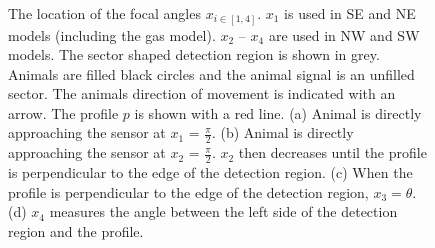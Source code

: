\begin{figure}[t]
  \centering
{
  
}
\caption[The location of the focal angles $x_{i\in[1,4]}$]{
The location of the focal angles $x_{i\in[1,4]}$. 
$x_1$ is used in SE and NE models (including the gas model). 
$x_2$ -- $x_4$ are used in NW and SW models. 
The sector shaped detection region is shown in grey. 
Animals are filled black circles and the animal signal is an unfilled sector. 
The animals direction of movement is indicated with an arrow. 
The profile $p$ is shown with a red line. 
(a) Animal is directly approaching the sensor at $x_1$ = $\frac{\pi}{2}$. 
(b) Animal is directly approaching the sensor at $x_2$ = $\frac{\pi}{2}$. 
$x_2$ then decreases until the profile is perpendicular to the edge of the detection region. 
(c) When the profile is perpendicular to the edge of the detection region, $x_3 = \theta$. 
(d) $x_4$ measures the angle between the left side of the detection region and the profile.}

\label{f:xis}
\end{figure}




